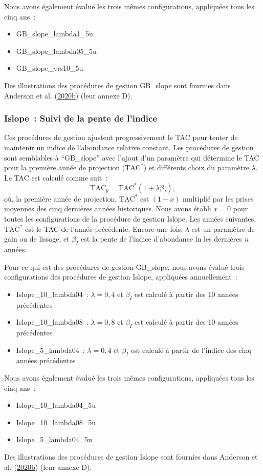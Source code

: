 \documentclass[11pt]{book}
\begin{document}
Nous avons également évalué les trois mêmes configurations, appliquées tous les cinq ans~:
\begin{itemize}
\item
  GB\_slope\_lambda1\_5u
\item
  GB\_slope\_lambda05\_5u
\item
  GB\_slope\_yrs10\_5u
\end{itemize}
Des illustrations des procédures de gestion GB\_slope sont fournies dans Anderson et al. (\protect\hyperlink{ref-anderson2020gfmp}{2020}\protect\hyperlink{ref-anderson2020gfmp}{b}) (leur annexe D).

\hypertarget{sec:mp-islope-track}{%
\subsubsection{Islope~: Suivi de la pente de l'indice}\label{sec:mp-islope-track}}

Ces procédures de gestion ajustent progressivement le TAC pour tenter de maintenir un indice de l'abondance relative constant. Les procédures de gestion sont semblables à ``GB\_slope'' avec l'ajout d'un paramètre qui détermine le TAC pour la première année de projection (\(\textrm{TAC}^*\)) et différents choix du paramètre \(\lambda\). Le TAC est calculé comme suit~:
\begin{equation}
\textrm{TAC}_y = \textrm{TAC}^*(1+\lambda \beta_I),
\end{equation}
où, la première année de projection, \(\textrm{TAC}^*\) est \((1-x)\) multiplié par les prises moyennes des cinq dernières années historiques. Nous avons établi \(x = 0\) pour toutes les configurations de la procédure de gestion Islope. Les années suivantes, \(\textrm{TAC}^*\) est le TAC de l'année précédente. Encore une fois, \(\lambda\) est un paramètre de gain ou de lissage, et \(\beta_I\) est la pente de l'indice d'abondance ln les dernières \(n\) années.

Pour ce qui est des procédures de gestion GB\_slope, nous avons évalué trois configurations des procédures de gestion Islope, appliquées annuellement~:
\begin{itemize}
\item
  Islope\_10\_lambda04~: \(\lambda = 0,4\) et \(\beta_I\) est calculé à partir des 10 années précédentes
\item
  Islope\_10\_lambda08~: \(\lambda = 0,8\) et \(\beta_I\) est calculé à partir des 10 années précédentes
\item
  Islope\_5\_lambda04~: \(\lambda = 0,4\) et \(\beta_I\) est calculé à partir de l'indice des cinq années précédentes
\end{itemize}
Nous avons également évalué les trois mêmes configurations, appliquées tous les cinq ans~:
\begin{itemize}
\item
  Islope\_10\_lambda04\_5u
\item
  Islope\_10\_lambda08\_5u
\item
  Islope\_5\_lambda04\_5u
\end{itemize}
Des illustrations des procédures de gestion Islope sont fournies dans Anderson et al. (\protect\hyperlink{ref-anderson2020gfmp}{2020}\protect\hyperlink{ref-anderson2020gfmp}{b}) (leur annexe D).
\end{document}
